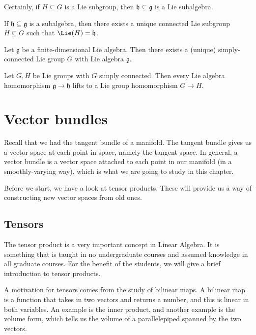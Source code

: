 \documentclass[a4paper]{article}
\begin{document}
Certainly, if $H \subseteq G$ is a Lie subgroup, then $\mathfrak{h} \subseteq \mathfrak{g}$ is a Lie subalgebra.

\begin{thm}
  If $\mathfrak{h} \subseteq \mathfrak{g}$ is a subalgebra, then there exists a unique connected Lie subgroup $H \subseteq G$ such that $\Lie(H) = \mathfrak{h}$.
\end{thm}

\begin{thm}
  Let $\mathfrak{g}$ be a finite-dimensional Lie algebra. Then there exists a (unique) simply-connected Lie group $G$ with Lie algebra $\mathfrak{g}$.
\end{thm}

\begin{thm}
  Let $G, H$ be Lie groups with $G$ simply connected. Then every Lie algebra homomorphism $\mathfrak{g} \to \mathfrak{h}$ lifts to a Lie group homomorphism $G \to H$.
\end{thm}

\section{Vector bundles}
Recall that we had the tangent bundle of a manifold. The tangent bundle gives us a vector space at each point in space, namely the tangent space. In general, a vector bundle is a vector space attached to each point in our manifold (in a smoothly-varying way), which is what we are going to study in this chapter.

Before we start, we have a look at tensor products. These will provide us a way of constructing new vector spaces from old ones.

\subsection{Tensors} %
The tensor product is a very important concept in Linear Algebra. It is something that is taught in no undergraduate courses and assumed knowledge in all graduate courses. For the benefit of the students, we will give a brief introduction to tensor products.

A motivation for tensors comes from the study of bilinear maps. A bilinear map is a function that takes in two vectors and returns a number, and this is linear in both variables. An example is the inner product, and another example is the volume form, which tells us the volume of a parallelepiped spanned by the two vectors.
\end{document}
